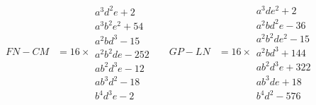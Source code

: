 \documentclass[11pt,a4paper]{article}
\theoremstyle{definition}
\begin{document}
\begin{align*}
FN - CM &= 16 \times
\begin{array}{l}
a^{3}d^{2}e + 2\\
a^{3}b^{2}e^{2} + 54\\
a^{2}bd^{3} - 15\\
a^{2}b^{2}de - 252\\
ab^{2}d^{3}e - 12\\
ab^{3}d^{2} - 18\\
b^{4}d^{3}e - 2
\end{array}
&&
GP - LN &= 16 \times
\begin{array}{l}
a^{3}de^{2} + 2\\
a^{2}bd^{2}e - 36\\
a^{2}b^{2}de^{2} - 15\\
a^{2}bd^{3} + 144\\
ab^{2}d^{3}e + 322\\
ab^{3}de + 18\\
b^{4}d^{2} - 576
\end{array}
\end{align*}
\end{document}
